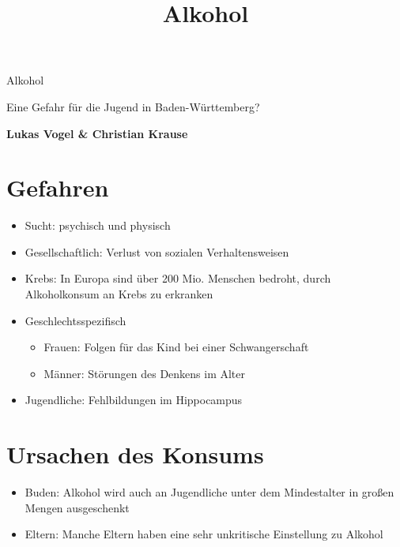 \documentclass[12pt]{article}
\begin{document}
\title{Alkohol}
    \begin{center}
        
        {\huge{Alkohol}}
 
        \vspace{0.7cm}
         {\Large Eine Gefahr für die Jugend in Baden-Württemberg?}
             
        \vspace{0.5cm}
 
        \textbf{Lukas Vogel \& Christian Krause}
        \vspace{1cm}
             
                  
    \end{center}

 \tableofcontents
    \vspace{1cm}
 \section{Gefahren}
 \begin{itemize}
    \item Sucht: psychisch und physisch
    \item Gesellschaftlich: Verlust von sozialen Verhaltensweisen
    \item Krebs: In Europa sind über 200 Mio. Menschen bedroht, durch Alkoholkonsum an Krebs zu erkranken
    \item Geschlechtsspezifisch
        \begin{itemize}[nosep]
            \item Frauen: Folgen für das Kind bei einer Schwangerschaft
            \item Männer: Störungen des Denkens im Alter
        \end{itemize}
    \item Jugendliche: Fehlbildungen im Hippocampus
 \end{itemize}

 \section{Ursachen des Konsums}
 \begin{itemize}
    \item Buden: Alkohol wird auch an Jugendliche unter dem Mindestalter in großen Mengen ausgeschenkt 
    \item Eltern: Manche Eltern haben eine sehr unkritische Einstellung zu Alkohol
 \end{itemize}
\end{document}
